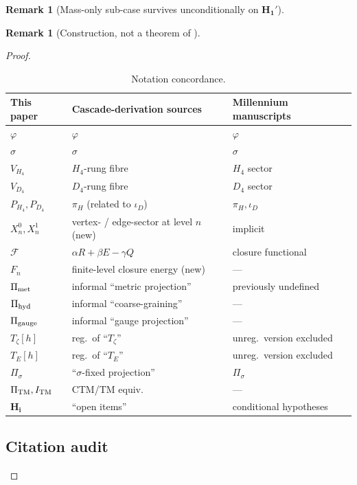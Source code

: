 \documentclass[11pt, a4paper]{amsart}
\theoremstyle{definition}
\newtheorem{remark}[theorem]{Remark}
\newcommand{\pphi}{\varphi}
\newcommand{\met}{{\rm met}}
\newcommand{\hyd}{{\rm hyd}}
\newcommand{\gge}{{\rm gauge}}
\newcommand{\TM}{{\rm TM}}
\begin{document}
\begin{remark}[Mass-only sub-case survives unconditionally on $\mathbf{H_1'}$]
\begin{remark}[Construction, not a theorem of \cite{CascadeEmbeddings}]
\begin{proof}
\begin{table}[h]
\caption{Notation concordance.}
\label{tab:notation}
\begin{tabular}{lll}
\hline
This paper & Cascade-derivation sources & Millennium manuscripts \\
\hline
$\pphi$ & $\varphi$ \cite{CascadeFoundations} & $\varphi$ \\
$\sigma$ & $\sigma$ \cite[\S F5]{CascadeFoundations} & $\sigma$ \\
$V_{H_4}$ & $H_4$-rung fibre \cite[\S 3]{CascadeEmbeddings} & $H_4$ sector \\
$V_{D_4}$ & $D_4$-rung fibre \cite[\S 2]{CascadeEmbeddings} & $D_4$ sector \\
$P_{H_4}, P_{D_4}$ & $\pi_H$ (related to $\iota_D$) & $\pi_H, \iota_D$ \\
$X_n^0, X_n^1$ & vertex- / edge-sector at level $n$ (new) & implicit \\
$\mathcal{F}$ & $\alpha R + \beta E - \gamma Q$ \cite[\S F2]{CascadeFoundations} & closure functional \\
$F_n$ & finite-level closure energy (new) & --- \\
$\Pi_{\met}$ & informal ``metric projection'' \cite{MillenniumNS, MillenniumPoincare} & previously undefined \\
$\Pi_{\hyd}$ & informal ``coarse-graining'' \cite{MillenniumNS} & --- \\
$\Pi_{\gge}$ & informal ``gauge projection'' \cite{MillenniumYM} & --- \\
$T_\zeta[h]$ & reg.\ of ``$T_\zeta$'' \cite{MillenniumRH} & unreg.\ version excluded \\
$T_E[h]$ & reg.\ of ``$T_E$'' \cite{MillenniumBSD} & unreg.\ version excluded \\
$\Pi_\sigma$ & ``$\sigma$-fixed projection'' \cite{MillenniumHodge} & $\Pi_\sigma$ \\
$\Pi_{\TM}, I_{\TM}$ & CTM/TM equiv.\ \cite{MillenniumPNP} & --- \\
$\mathbf{H_i}$ & ``open items'' & conditional hypotheses \\
\hline
\end{tabular}
\end{table}

\subsection{Citation audit}


\end{proof}
\end{remark}
\end{remark}
\end{document}
